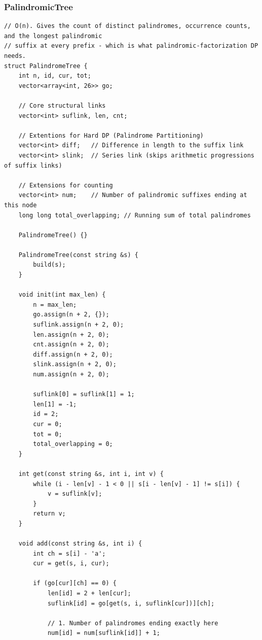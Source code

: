 \documentclass[9pt,a4paper,twocolumn]{extarticle}
\begin{document}
\subsubsection{PalindromicTree}
\nopagebreak
\begin{lstlisting}
// O(n). Gives the count of distinct palindromes, occurrence counts, and the longest palindromic
// suffix at every prefix - which is what palindromic-factorization DP needs.
struct PalindromeTree {
    int n, id, cur, tot;
    vector<array<int, 26>> go;

    // Core structural links
    vector<int> suflink, len, cnt;

    // Extentions for Hard DP (Palindrome Partitioning)
    vector<int> diff;   // Difference in length to the suffix link
    vector<int> slink;  // Series link (skips arithmetic progressions of suffix links)

    // Extensions for counting
    vector<int> num;    // Number of palindromic suffixes ending at this node
    long long total_overlapping; // Running sum of total palindromes

    PalindromeTree() {}

    PalindromeTree(const string &s) {
        build(s);
    }

    void init(int max_len) {
        n = max_len;
        go.assign(n + 2, {});
        suflink.assign(n + 2, 0);
        len.assign(n + 2, 0);
        cnt.assign(n + 2, 0);
        diff.assign(n + 2, 0);
        slink.assign(n + 2, 0);
        num.assign(n + 2, 0);

        suflink[0] = suflink[1] = 1;
        len[1] = -1;
        id = 2;
        cur = 0;
        tot = 0;
        total_overlapping = 0;
    }

    int get(const string &s, int i, int v) {
        while (i - len[v] - 1 < 0 || s[i - len[v] - 1] != s[i]) {
            v = suflink[v];
        }
        return v;
    }

    void add(const string &s, int i) {
        int ch = s[i] - 'a';
        cur = get(s, i, cur);

        if (go[cur][ch] == 0) {
            len[id] = 2 + len[cur];
            suflink[id] = go[get(s, i, suflink[cur])][ch];

            // 1. Number of palindromes ending exactly here
            num[id] = num[suflink[id]] + 1;


\end{lstlisting}
\end{document}
